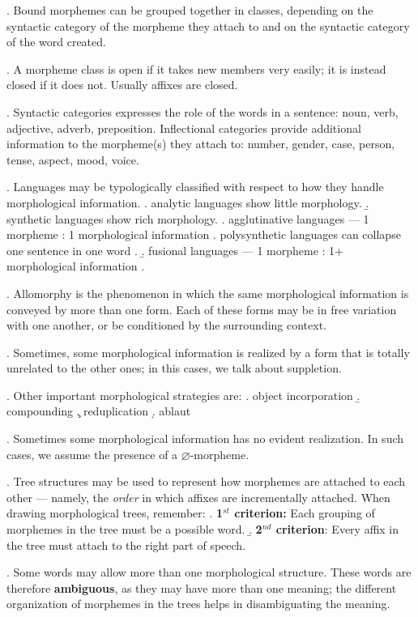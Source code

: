 \documentclass[11pt, oneside]{article}   	%
\begin{document}
\ex. Bound morphemes can be grouped together in classes, depending on the syntactic category of the morpheme they attach to and on the syntactic category of the word created.

\ex. A morpheme class is open if it takes new members very easily; it is instead closed if it does not. Usually affixes are closed.

\ex. Syntactic categories expresses the role of the words in a sentence: noun, verb, adjective, adverb, preposition. Inflectional categories provide additional information to the morpheme(s) they attach to: number, gender, case, person, tense, aspect, mood, voice.

\ex. Languages may be typologically classified with respect to how they handle morphological information. 
	\a. analytic languages show little morphology.
	\b. synthetic languages show rich morphology.
		\a. agglutinative languages --- 1 morpheme : 1 morphological information
			\a. polysynthetic languages can collapse one sentence in one word
			\z.
		\b. fusional languages --- 1 morpheme : 1+ morphological information
	\z.
	
\ex. Allomorphy is the phenomenon in which the same morphological information is conveyed by more than one form. Each of these forms may be in free variation with one another, or be conditioned by the surrounding context.

\ex. Sometimes, some morphological information is realized by a form that is totally unrelated to the other ones; in this cases, we talk about suppletion.

\ex. Other important morphological strategies are:
	\a. object incorporation
	\b. compounding
	\c. reduplication
	\d. ablaut

\ex. Sometimes some morphological information has no evident realization. In such cases, we assume the presence of a $\varnothing$-morpheme.

\ex. Tree structures may be used to represent how morphemes are attached to each other --- namely, the {\itshape order} in which affixes are incrementally attached. When drawing morphological trees, remember:
	\a. {\bfseries 1$^{st}$ criterion:} Each grouping of morphemes in the tree must be a possible word.
	\b. {\bfseries 2$^{nd}$ criterion}: Every affix in the tree must attach to the right part of speech.
	
\ex. Some words may allow more than one morphological structure. These words are therefore {\bfseries ambiguous}, as they may have more than one meaning; the different organization of morphemes in the trees helps in disambiguating the meaning.
\end{document}
